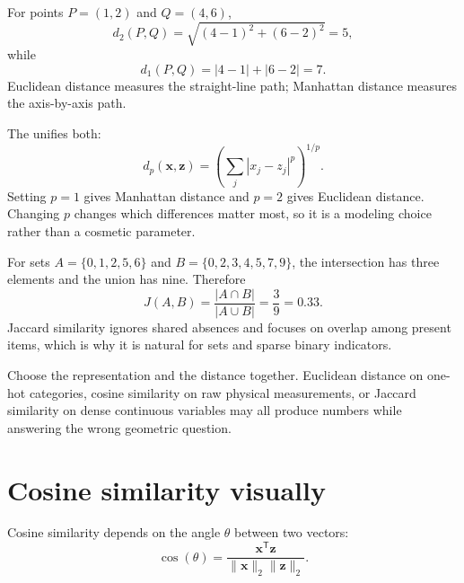 \begin{workedexample}
For points $P=(1,2)$ and $Q=(4,6)$,
\[
 d_2(P,Q)=\sqrt{(4-1)^2+(6-2)^2}=5,
\]
while
\[
 d_1(P,Q)=|4-1|+|6-2|=7.
\]
Euclidean distance measures the straight-line path; Manhattan distance measures the axis-by-axis path.
\end{workedexample}

The  unifies both:
\[
 d_p(\bm{x},\bm{z})=
 \left(\sum_j |x_j-z_j|^p\right)^{1/p}.
\]
Setting $p=1$ gives Manhattan distance and $p=2$ gives Euclidean distance. Changing $p$ changes which differences matter most, so it is a modeling choice rather than a cosmetic parameter.

\begin{workedexample}
For sets $A=\{0,1,2,5,6\}$ and $B=\{0,2,3,4,5,7,9\}$, the intersection has three elements and the union has nine. Therefore
\[
 J(A,B)=\frac{|A\cap B|}{|A\cup B|}=\frac{3}{9}=0.33.
\]
Jaccard similarity ignores shared absences and focuses on overlap among present items, which is why it is natural for sets and sparse binary indicators.
\end{workedexample}

\begin{keyidea}
Choose the representation and the distance together. Euclidean distance on one-hot categories, cosine similarity on raw physical measurements, or Jaccard similarity on dense continuous variables may all produce numbers while answering the wrong geometric question.
\end{keyidea}

\section{Cosine similarity visually}

Cosine similarity depends on the angle $\theta$ between two vectors:
\[
  \cos(\theta)=\frac{\bm{x}^{\mathsf T}\bm{z}}{\|\bm{x}\|_2\|\bm{z}\|_2}.
\]

\begin{mlfigure}
\end{mlfigure}


